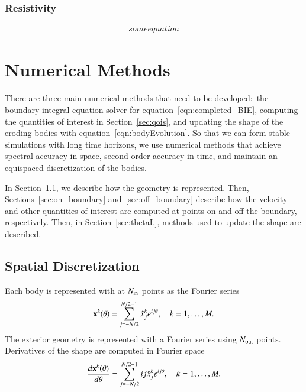\documentclass[preprint, 10pt]{elsarticle}
\begin{document}
\subsubsection{Resistivity}
\begin{align}
  some equation
  \label{eqn:resistivity}
\end{align}



\section{Numerical Methods\label{s:method}} 
There are three main numerical methods that need to be developed:~the
boundary integral equation solver for
equation~\eqref{eqn:completed_BIE}, computing the quantities of interest
in Section~\ref{sec:qois}, and updating the shape of the eroding bodies
with equation~\eqref{eqn:bodyEvolution}.  So that we can form stable
simulations with long time horizons, we use numerical methods that
achieve spectral accuracy in space, second-order accuracy in time, and
maintain an equispaced discretization of the bodies.

In Section~\ref{sec:spatial_discretization}, we describe how the
geometry is represented.  Then, Sections~\ref{sec:on_boundary}
and~\ref{sec:off_boundary} describe how the velocity and other
quantities of interest are computed at points on and off the boundary,
respectively.  Then, in Section~\ref{sec:thetaL}, methods used to update
the shape are described.


\subsection{Spatial Discretization}
\label{sec:spatial_discretization}
Each body is represented with at $N_{\mathrm{in}}$ points as the Fourier series
\begin{align*}
  {\mathbf{x}}^k(\theta) = \sum_{j = -N/2}^{N/2-1} \hat{x}_j^k e^{ij\theta},
    \quad k=1,\ldots,M.
\end{align*}
The exterior geometry is represented with a Fourier series using
$N_{\mathrm{out}}$ points.  Derivatives of the shape are computed in Fourier space
\begin{align*}
  \frac{d{\mathbf{x}}^k(\theta)}{d\theta} = 
    \sum_{j = -N/2}^{N/2-1} ij\hat{x}_j^k e^{ij\theta},
    \quad k=1,\ldots,M.
\end{align*}
\end{document}
